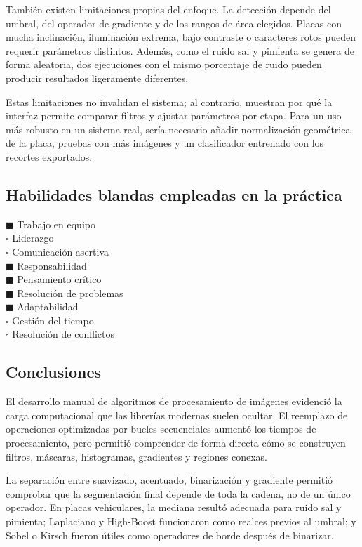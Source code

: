 \documentclass[11pt]{article}
\begin{document}
También existen limitaciones propias del enfoque. La detección depende del umbral, del operador de gradiente y de los rangos de área elegidos. Placas con mucha inclinación, iluminación extrema, bajo contraste o caracteres rotos pueden requerir parámetros distintos. Además, como el ruido sal y pimienta se genera de forma aleatoria, dos ejecuciones con el mismo porcentaje de ruido pueden producir resultados ligeramente diferentes.

Estas limitaciones no invalidan el sistema; al contrario, muestran por qué la interfaz permite comparar filtros y ajustar parámetros por etapa. Para un uso más robusto en un sistema real, sería necesario añadir normalización geométrica de la placa, pruebas con más imágenes y un clasificador entrenado con los recortes exportados.

\subsection{Habilidades blandas empleadas en la práctica}
$\blacksquare$ Trabajo en equipo \\
$\square$ Liderazgo \\
$\square$ Comunicación asertiva \\
$\blacksquare$ Responsabilidad \\
$\blacksquare$ Pensamiento crítico \\
$\blacksquare$ Resolución de problemas \\
$\blacksquare$ Adaptabilidad \\
$\square$ Gestión del tiempo \\
$\square$ Resolución de conflictos

\subsection{Conclusiones}

El desarrollo manual de algoritmos de procesamiento de imágenes evidenció la carga computacional que las librerías modernas suelen ocultar. El reemplazo de operaciones optimizadas por bucles secuenciales aumentó los tiempos de procesamiento, pero permitió comprender de forma directa cómo se construyen filtros, máscaras, histogramas, gradientes y regiones conexas.

La separación entre suavizado, acentuado, binarización y gradiente permitió comprobar que la segmentación final depende de toda la cadena, no de un único operador. En placas vehiculares, la mediana resultó adecuada para ruido sal y pimienta; Laplaciano y High-Boost funcionaron como realces previos al umbral; y Sobel o Kirsch fueron útiles como operadores de borde después de binarizar.
\end{document}
